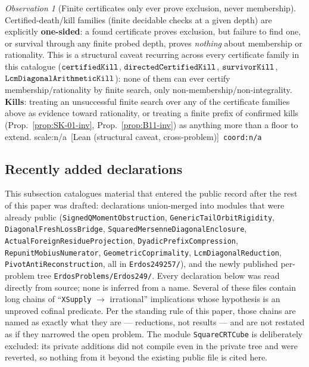 \documentclass[11pt]{article}
\theoremstyle{plain}
\theoremstyle{definition}
\theoremstyle{remark}
\newtheorem{obs}[thm]{Observation}
\newcommand{\lean}[2]{\leanlink{#2}}
\let\origmathtt\mathtt
\renewcommand{\mathtt}[1]{\ifmmode\origmathtt{#1}\else\texttt{#1}\fi}%
\newcommand{\ev}[1]{{\small\textsf{[#1]}}\xspace}
\newcommand{\scale}[1]{{\small\textsf{scale:#1}}\xspace}
\newcommand{\coord}[1]{\texorpdfstring{{\small\nolinkurl{coord:#1}}}{coord:#1}\xspace}
\begin{document}
\begin{obs}[Finite certificates only ever prove exclusion, never membership]\label{prop:B11cert-kill}
Certified-death/kill families (finite decidable checks at a given depth) are explicitly
\textbf{one-sided}: a found certificate proves exclusion, but failure to find one, or survival
through any finite probed depth, proves \emph{nothing} about membership or rationality. This is a
structural caveat recurring across every certificate family in this catalogue
($\mathtt{certifiedKill}$, $\mathtt{directedCertifiedKill}$, $\mathtt{survivorKill}$,
$\mathtt{LcmDiagonalArithmeticKill}$): none of them can ever certify membership/rationality by
finite search, only non-membership/non-integrality. \textbf{Kills}: treating an unsuccessful finite
search over any of the certificate families above as evidence toward rationality, or treating a
finite prefix of confirmed kills (Prop.~\ref{prop:SK-01-inv}, Prop.~\ref{prop:B11-inv}) as
anything more than a floor to extend.
\scale{n/a}\ \ev{Lean (structural caveat, cross-problem)}\ \coord{n/a}\\
\lean{CertifiedGreedyMersenneDeath}{GreedyAchievementSet.lean:1756}
\end{obs}
\subsection{Recently added declarations}

This subsection catalogues material that entered the public record after the
rest of this paper was drafted: declarations union-merged into modules that
were already public (\texttt{SignedQMomentObstruction},
\texttt{GenericTailOrbitRigidity}, \texttt{DiagonalFreshLossBridge},
\texttt{SquaredMersenneDiagonalEnclosure},
\texttt{ActualForeignResidueProjection}, \texttt{DyadicPrefixCompression},
\texttt{RepunitMobiusNumerator}, \texttt{GeometricCoprimality},
\texttt{LcmDiagonalReduction}, \texttt{PivotAntiReconstruction}, all in
\texttt{Erdos249257/}), and the newly published per-problem tree
\texttt{ErdosProblems/Erdos249/}. Every declaration below was read directly
from source; none is inferred from a name. Several of these files contain
long chains of ``\texttt{XSupply} $\to$ irrational'' implications whose
hypothesis is an unproved cofinal predicate. Per the standing rule of this
paper, those chains are named as exactly what they are --- reductions, not
results --- and are not restated as if they narrowed the open problem. The
module \texttt{SquareCRTCube} is deliberately excluded: its private additions
did not compile even in the private tree and were reverted, so nothing from
it beyond the existing public file is cited here.
\end{document}
